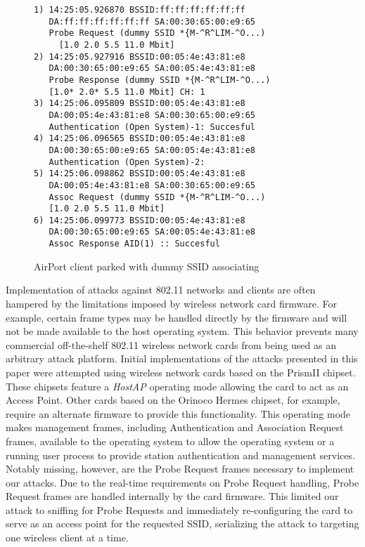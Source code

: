 \documentclass[10pt,twocolumn]{article}
\begin{document}
\begin{figure}[htb]
\begin{verbatim}
1) 14:25:05.926870 BSSID:ff:ff:ff:ff:ff:ff
   DA:ff:ff:ff:ff:ff:ff SA:00:30:65:00:e9:65
   Probe Request (dummy SSID *{M-^R^LIM-^O...)
     [1.0 2.0 5.5 11.0 Mbit]
2) 14:25:05.927916 BSSID:00:05:4e:43:81:e8
   DA:00:30:65:00:e9:65 SA:00:05:4e:43:81:e8
   Probe Response (dummy SSID *{M-^R^LIM-^O...)
   [1.0* 2.0* 5.5 11.0 Mbit] CH: 1
3) 14:25:06.095809 BSSID:00:05:4e:43:81:e8
   DA:00:05:4e:43:81:e8 SA:00:30:65:00:e9:65
   Authentication (Open System)-1: Succesful
4) 14:25:06.096565 BSSID:00:05:4e:43:81:e8
   DA:00:30:65:00:e9:65 SA:00:05:4e:43:81:e8
   Authentication (Open System)-2: 
5) 14:25:06.098862 BSSID:00:05:4e:43:81:e8
   DA:00:05:4e:43:81:e8 SA:00:30:65:00:e9:65
   Assoc Request (dummy SSID *{M-^R^LIM-^O...)
   [1.0 2.0 5.5 11.0 Mbit]
6) 14:25:06.099773 BSSID:00:05:4e:43:81:e8
   DA:00:30:65:00:e9:65 SA:00:05:4e:43:81:e8
   Assoc Response AID(1) :: Succesful
\end{verbatim}  
\caption{AirPort client parked with dummy SSID associating}
\label{osxapdummy}
\end{figure}


Implementation of attacks against 802.11 networks and clients are
often hampered by the limitations imposed by wireless network card
firmware.  For example, certain frame types may be handled directly by
the firmware and will not be made available to the host operating
system.  This behavior prevents many commercial off-the-shelf 802.11
wireless network cards from being used as an arbitrary attack
platform.  Initial implementations of the attacks presented in this
paper were attempted using wireless network cards based on the PrismII
chipset.  These chipsets feature a {\it HostAP} operating mode
allowing the card to act as an Access Point.  Other cards based on the
Orinoco Hermes chipset, for example, require an alternate firmware to
provide this functionality.  This operating mode makes management
frames, including Authentication and Association Request frames,
available to the operating system to allow the operating system or a
running user process to provide station authentication and management
services.  Notably missing, however, are the Probe Request frames
necessary to implement our attacks.  Due to the real-time requirements
on Probe Request handling, Probe Request frames are handled internally
by the card firmware.  This limited our attack to sniffing for Probe
Requests and immediately re-configuring the card to serve as an access
point for the requested SSID, serializing the attack to targeting one
wireless client at a time.
\end{document}
